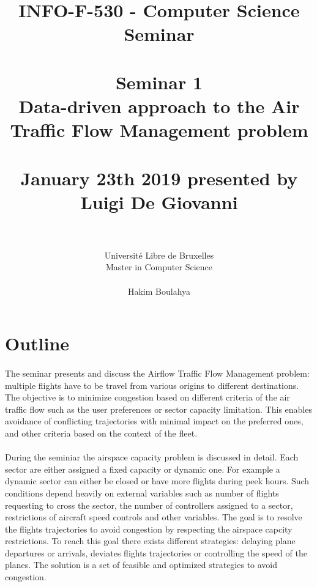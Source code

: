 \documentclass[11pt,a4paper]{article}
\date{}
\begin{document}
\title{
\large INFO-F-530 - Computer Science Seminar \\~\\
\LARGE Seminar 1 \\ Data-driven approach to the Air Traffic Flow Management problem \\~\\
\Large January 23th 2019 presented by Luigi De Giovanni \\~\\}
\author{Université Libre de Bruxelles
\\ Master in Computer Science \\
\\ Hakim Boulahya}
\maketitle

\section{Outline}

\paragraph{}

The seminar presents and discuss the Airflow Traffic Flow Management problem: multiple flights have to be travel from various origins to different destinations. The objective is to minimize congestion based on different criteria of the air traffic flow such as the user preferences or sector capacity limitation. This enables avoidance of conflicting trajectories with minimal impact on the preferred ones, and other criteria based on the context of the fleet.


\paragraph{}

During the seminiar the airspace capacity problem is discussed in detail. Each sector are either assigned a fixed capacity or dynamic one. For example a dynamic sector can either be closed or have more flights during peek hours. Such conditions depend heavily on external variables such as number of flights requesting to cross the sector, the number of controllers assigned to a sector, restrictions of aircraft speed controls and other variables. The goal is to resolve the flights trajectories to avoid congestion by respecting the airspace capcity restrictions. To reach this goal there exists different strategies: delaying plane departures or arrivals, deviates flights trajectories or controlling the speed of the planes. The solution is a set of feasible and optimized strategies to avoid congestion.
\end{document}
